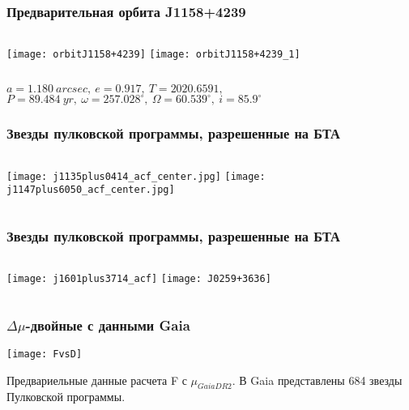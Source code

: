 

\begin{frame}%
\frametitle{Предварительная орбита J1158+4239}
\begin{columns}
 \texttt{[image: orbitJ1158+4239]}
	\texttt{[image: orbitJ1158+4239\_1]}
\end{columns}
{\footnotesize 
	$a = 1.180~arcsec,~e=0.917,~T=2020.6591,$ $P=89.484~yr,~\omega=257.028^{\circ},~\Omega=60.539^{\circ},~i=85.9^{\circ}$
}
\end{frame}



\begin{frame}%
\frametitle{Звезды пулковской программы, разрешенные на БТА}
\begin{columns}
 \texttt{[image: j1135plus0414\_acf\_center.jpg]}
	\texttt{[image: j1147plus6050\_acf\_center.jpg]}
\end{columns}
\end{frame}



\begin{frame}%
\frametitle{Звезды пулковской программы, разрешенные на БТА}
\begin{columns}
 \texttt{[image: j1601plus3714\_acf]}
	\texttt{[image: J0259+3636]}
\end{columns}
\end{frame}


\begin{frame}
\frametitle{$\Delta\mu$-двойные с данными Gaia}
\begin{center}
	\texttt{[image: FvsD]}
\end{center}
{\footnotesize
	Предвариельные данные расчета F с $\mu_{Gaia DR2}$.  В Gaia представлены 684 звезды Пулковской программы.
}
\end{frame}


